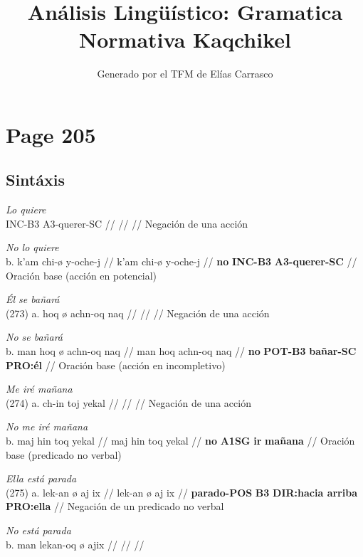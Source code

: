 \documentclass{article}%
\title{Análisis Lingüístico: Gramatica Normativa Kaqchikel}%
\author{Generado por el TFM de Elías Carrasco}%
\begin{document}
%
\normalsize%
\maketitle%
\section{Page 205}%
\label{sec:Page205}%
\subsection{Sintáxis}%
\label{subsec:Sintxis}%

%
\par\medskip%
\ex
\textit{Lo quiere} \\
\begingl
\gla INC-B3 A3-querer-SC //
\glb  //
\glc  //
\endgl
\xe
%
\medskip%
Negación de una acción %
\par\medskip%
\ex
\textit{No lo quiere} \\
\begingl
\gla b. k’am chi-ø y-oche-j //
\glb k’am chi-ø y-oche-j //
\glc \textbf{no} \textbf{INC-B3} \textbf{A3-querer-SC} //
\endgl
\xe
%
\medskip%
Oración base (acción en potencial) %
\par\medskip%
\ex
\textit{Él se bañará} \\
\begingl
\gla (273) a. hoq ø achn-oq naq //
\glb  //
\glc  //
\endgl
\xe
%
\medskip%
Negación de una acción %
\par\medskip%
\ex
\textit{No se bañará} \\
\begingl
\gla b. man hoq ø achn-oq naq //
\glb man hoq achn-oq naq //
\glc \textbf{no} \textbf{POT-B3} \textbf{bañar-SC} \textbf{PRO:él} //
\endgl
\xe
%
\medskip%
Oración base (acción en incompletivo) %
\par\medskip%
\ex
\textit{Me iré mañana} \\
\begingl
\gla (274) a. ch-in toj yekal //
\glb  //
\glc  //
\endgl
\xe
%
\medskip%
Negación de una acción %
\par\medskip%
\ex
\textit{No me iré mañana} \\
\begingl
\gla b. maj hin toq yekal //
\glb maj hin toq yekal //
\glc \textbf{no} \textbf{A1SG} \textbf{ir} \textbf{mañana} //
\endgl
\xe
%
\medskip%
Oración base (predicado no verbal) %
\par\medskip%
\ex
\textit{Ella está parada} \\
\begingl
\gla (275) a. lek-an ø aj ix //
\glb lek-an ø aj ix //
\glc \textbf{parado-POS} \textbf{B3} \textbf{DIR:hacia arriba} \textbf{PRO:ella} //
\endgl
\xe
%
\medskip%
Negación de un predicado no verbal %
\par\medskip%
\ex
\textit{No está parada} \\
\begingl
\gla b. man lekan-oq ø ajix //
\glb  //
\glc  //
\endgl
\xe
%
\medskip

%
\end{document}

